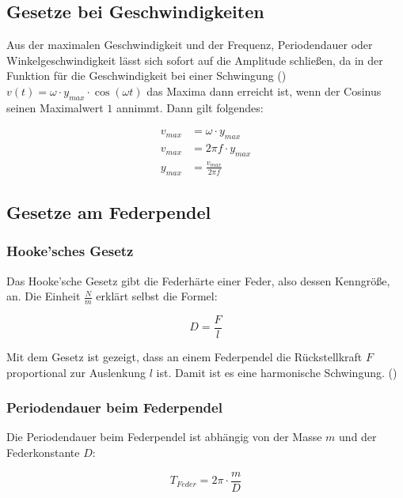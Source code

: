 \subsection{Gesetze bei Geschwindigkeiten}

Aus der maximalen Geschwindigkeit und der Frequenz, Periodendauer oder Winkelgeschwindigkeit lässt sich sofort auf die Amplitude schließen, da in der Funktion für die Geschwindigkeit bei einer Schwingung () $v(t)=\omega \cdot y_{max} \cdot \cos{(\omega t)}$ das Maxima dann erreicht ist, wenn der Cosinus seinen Maximalwert $1$ annimmt. Dann gilt folgendes:

\begin{align*} \label{eq:geschwindigkeit_amplitude}
	v_{max} &= \omega \cdot y_{max} \\
	v_{max} &= 2\pi f \cdot y_{max} \\
	y_{max} &= \frac{v_{max}}{2\pi f}
\end{align*}


\subsection{Gesetze am Federpendel}

\subsubsection{Hooke'sches Gesetz}

Das Hooke'sche Gesetz gibt die Federhärte einer Feder, also dessen Kenngröße, an. Die Einheit $\frac{N}{m}$ erklärt selbst die Formel:

\begin{equation*}
	D=\frac{F}{l}
\end{equation*}

Mit dem Gesetz ist gezeigt, dass an einem Federpendel die Rückstellkraft $F$ proportional zur Auslenkung $l$ ist. Damit ist es eine harmonische Schwingung. ()

\subsubsection{Periodendauer beim Federpendel}

Die Periodendauer beim Federpendel ist abhängig von der Masse $m$ und der Federkonstante $D$:

\begin{equation*}
	T_{Feder}=2\pi \cdot \frac{m}{D}
\end{equation*}

